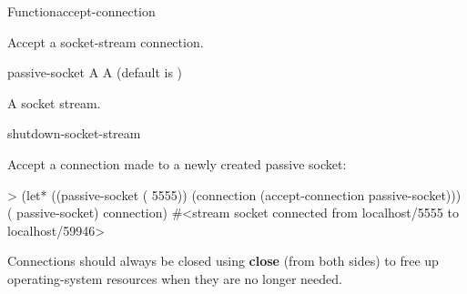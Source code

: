 \documentclass[10pt,twoside,english,pdftex]{article}
\begin{document}
\begin{functiondoc}{Function}{accept-connection}{
     
    \returns{} } 
%
%
%

\fnsyntax

\fnpurpose Accept a socket-stream connection.

\fnpackage {}

\fnmodule {}

\fnargs
\begin{args}{passive-socket}
 A 
\arg[wait] A  (default is )
\end{args}

\fnreturns A socket stream.

\begin{alsos}{shutdown-socket-stream}
\end{alsos}

%
%
\fnexample
Accept a connection made to a newly created passive socket:
\begin{example}
> (let* ((passive-socket ( 5555))
         (connection (accept-connection passive-socket)))
     ( passive-socket)
     connection)
#<stream socket connected from localhost/5555 to localhost/59946>
\end{example}

\fnnotes Connections should always be closed using \textbf{close}
(from both sides) to free up operating-system resources when they are
no longer needed.

\end{functiondoc}

\end{document}
